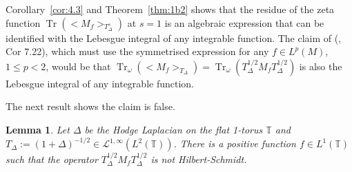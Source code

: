 \documentclass[final,1p]{elsarticle}
\numberwithin{equation}{section}
\theoremstyle{plain}
\newtheorem{lemma}[thm]{Lemma}
\theoremstyle{definition}
\begin{document}
Corollary~\ref{cor:4.3} and Theorem~\ref{thm:1b2} shows that the residue of the zeta function  $\operatorname{Tr}({\ensuremath{\big< {M_f} \big>_{{T_\Delta^s}}}})$ at $s=1$ is an algebraic
expression that can be identified
with the Lebesgue integral of any integrable function.  The claim of (\cite{GBVF}, Cor 7.22), which must use the symmetrised expression
for any $f \in L^p(M)$, $1 \leq p < 2$, would be that $\operatorname{Tr}_\omega({\ensuremath{\big< {M_f} \big>_{{T_\Delta}}}}) = \operatorname{Tr}_\omega(T_\Delta^{1/2} M_f T_\Delta^{1/2})$
is also the Lebesgue integral of any integrable function.

The next result shows the claim is false. 

\begin{lemma} \label{lemma:6.3}
Let $\Delta$ be the Hodge Laplacian on the flat 1-torus ${\ensuremath{\mathbb{T}}}$
and $T_\Delta := (1+\Delta)^{-1/2} \in \mathcal{L}^{1,\infty}(L^2({\ensuremath{\mathbb{T}}}))$.
There is a positive function $f \in L^1({\ensuremath{\mathbb{T}}})$
such that the operator $T_{\Delta}^{1/2}M_{f}T_{\Delta}^{1/2}$
is not Hilbert-Schmidt.
\end{lemma}
\end{document}
